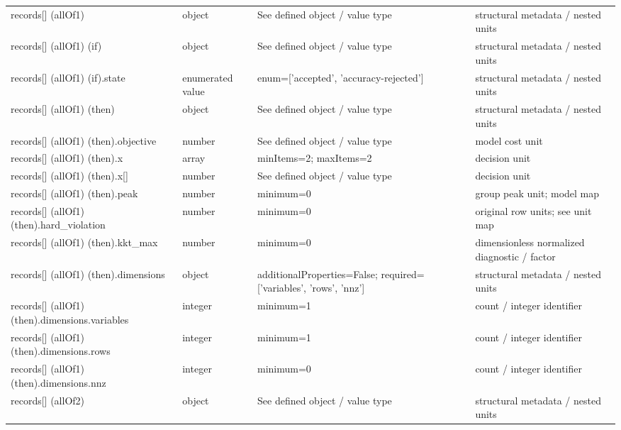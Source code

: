 \begin{longtable}{@{}>{\raggedright\arraybackslash}p{}>{\raggedright\arraybackslash}p{}>{\raggedright\arraybackslash}p{}>{\raggedright\arraybackslash}p{}@{}}
records[] (allOf1) & object & See defined object /\allowbreak{} value type & structural metadata /\allowbreak{} nested units\\
records[] (allOf1) (if) & object & See defined object /\allowbreak{} value type & structural metadata /\allowbreak{} nested units\\
records[] (allOf1) (if).\allowbreak{}state & enumerated value & enum=\allowbreak{}['accepted', 'accuracy-\allowbreak{}rejected'] & structural metadata /\allowbreak{} nested units\\
records[] (allOf1) (then) & object & See defined object /\allowbreak{} value type & structural metadata /\allowbreak{} nested units\\
records[] (allOf1) (then).\allowbreak{}objective & number & See defined object /\allowbreak{} value type & model cost unit\\
records[] (allOf1) (then).\allowbreak{}x & array & minItems=\allowbreak{}2; maxItems=\allowbreak{}2 & decision unit\\
records[] (allOf1) (then).\allowbreak{}x[] & number & See defined object /\allowbreak{} value type & decision unit\\
records[] (allOf1) (then).\allowbreak{}peak & number & minimum=\allowbreak{}0 & group peak unit; model map\\
records[] (allOf1) (then).\allowbreak{}hard\_\allowbreak{}violation & number & minimum=\allowbreak{}0 & original row units; see unit map\\
records[] (allOf1) (then).\allowbreak{}kkt\_\allowbreak{}max & number & minimum=\allowbreak{}0 & dimensionless normalized diagnostic /\allowbreak{} factor\\
records[] (allOf1) (then).\allowbreak{}dimensions & object & additionalProperties=\allowbreak{}False; required=\allowbreak{}['variables', 'rows', 'nnz'] & structural metadata /\allowbreak{} nested units\\
records[] (allOf1) (then).\allowbreak{}dimensions.\allowbreak{}variables & integer & minimum=\allowbreak{}1 & count /\allowbreak{} integer identifier\\
records[] (allOf1) (then).\allowbreak{}dimensions.\allowbreak{}rows & integer & minimum=\allowbreak{}1 & count /\allowbreak{} integer identifier\\
records[] (allOf1) (then).\allowbreak{}dimensions.\allowbreak{}nnz & integer & minimum=\allowbreak{}0 & count /\allowbreak{} integer identifier\\
records[] (allOf2) & object & See defined object /\allowbreak{} value type & structural metadata /\allowbreak{} nested units\\

\end{longtable}

